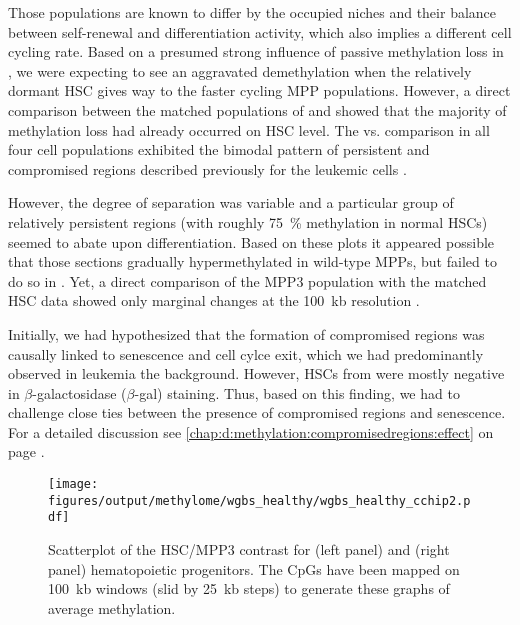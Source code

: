 Those populations are known to differ by the occupied niches and their balance between self-renewal and differentiation activity, which also implies a different cell cycling rate. Based on a presumed strong influence of passive methylation loss in \dnmtchip, we were expecting to see an aggravated demethylation when the relatively dormant HSC gives way to the faster cycling MPP populations. However, a direct comparison between the matched populations of \dnmtchip and \dnmtwt {} showed that the majority of methylation loss had already occurred on HSC level. The \dnmtchip vs. \dnmtwt comparison in all four cell populations exhibited the bimodal pattern of persistent and compromised regions described previously for the leukemic cells	. 

However, the degree of separation was variable and a particular group of relatively persistent regions (with roughly \SI{75}{\percent} methylation in normal HSCs) seemed to abate upon differentiation. Based on these plots it appeared possible that those sections gradually hypermethylated in wild-type MPPs, but failed to do so in \dnmtchip. Yet, a direct comparison of the MPP3 population with the matched HSC data showed only marginal changes at the \SI{100}{\kilo b} resolution . 

Initially, we had hypothesized that the formation of compromised regions was causally linked to senescence and cell cylce exit, which we had predominantly observed in leukemia the \dnmtchip background. However, HSCs from \dnmtchip were mostly negative in \ensuremath{\beta}-galactosidase (\ensuremath{\beta}-gal) staining. Thus, based on this finding, we had to challenge close ties between the presence of compromised regions and senescence. For a detailed discussion see \autoref{chap:d:methylation:compromisedregions:effect} on page \pageref{chap:d:methylation:compromisedregions:effect}. 

\begin{figure}[!ht] 
	\centering
	\texttt{[image: figures/output/methylome/wgbs\_healthy/wgbs\_healthy\_cchip2.pdf]} 
	\caption{Scatterplot of the HSC/MPP3 contrast for \dnmtwt (left panel) and \dnmtchip (right panel) hematopoietic progenitors. The CpGs have been mapped on \SI{100}{\kilo b} windows (slid by \SI{25}{\kilo b} steps) to generate these graphs of average methylation.}
	\label{fig:wgbs_healthy_cchip2}
\end{figure}

